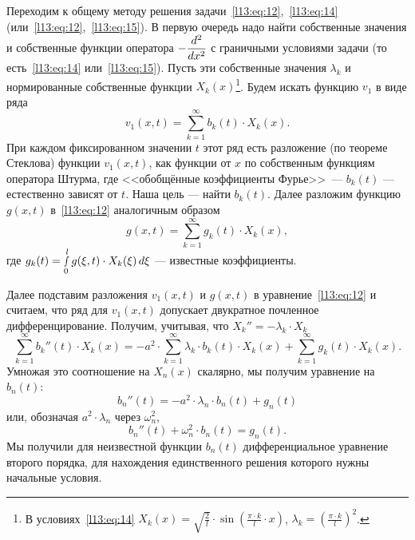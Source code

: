 Переходим к общему методу решения задачи~\eqref{l13:eq:12},~\eqref{l13:eq:14} (или~\eqref{l13:eq:12},~\eqref{l13:eq:15}). В первую очередь надо найти собственные значения и собственные функции оператора $\displaystyle-\frac{d^2}{dx^2}$ с граничными условиями задачи (то есть~\eqref{l13:eq:14} или~\eqref{l13:eq:15}). Пусть эти собственные значения $\lambda_k$ и нормированные собственные функции $X_k(x)$\footnote{В условиях~\eqref{l13:eq:14} $\displaystyle X_k(x)=\sqrt{\frac{2}{l}}\cdot\sin\left(\frac{\pi\cdot k}{l}\cdot x\right)$, $\displaystyle\lambda_k=\left(\frac{\pi\cdot k}{l}\right)^2$.}. Будем искать функцию $v_1$ в виде ряда
\begin{equation*}
	 v_1(x,t)=\sum\limits_{k=1}^{\infty}b_k(t)\cdot X_k(x).
\end{equation*}
При каждом фиксированном значении $t$ этот ряд есть разложение (по теореме Стеклова) функции $v_1(x,t)$, как функции от $x$ по собственным функциям оператора Штурма, где <<обобщённые коэффициенты Фурье>>~--- $b_k(t)$ --- естественно зависят от $t$. Наша цель --- найти $b_k(t)$. Далее разложим функцию $g(x,t)$ в~\eqref{l13:eq:12} аналогичным образом
\begin{equation*}
	 g(x,t)=\sum\limits_{k=1}^{\infty}g_k(t)\cdot X_k(x),
\end{equation*}
где $\displaystyle g_k(t)=\smallint\limits_0^l g(\xi,t)\cdot X_k(\xi)\,d\xi$ --- известные коэффициенты.

Далее подставим разложения $v_1(x,t)$ и $g(x,t)$ в уравнение~\eqref{l13:eq:12} и считаем, что ряд для $v_1(x,t)$ допускает двукратное почленное дифференцирование. Получим, учитывая, что $X_k''=-\lambda_k\cdot X_k$
\begin{equation*}
	\sum\limits_{k=1}^{\infty}b_k''(t)\cdot X_k(x)=-a^2\cdot\sum\limits_{k=1}^{\infty} \lambda_k\cdot b_k(t)\cdot X_k(x)+\sum\limits_{k=1}^{\infty}g_k(t)\cdot X_k(x).
\end{equation*}
Умножая это соотношение на $X_n(x)$ скалярно, мы получим уравнение на $b_n(t)$:
\begin{equation*}
	 b_n''(t)=-a^2\cdot\lambda_n\cdot b_n(t)+g_n(t)
\end{equation*}
или, обозначая $a^2\cdot\lambda_n$ через $\omega_n^2$,
\begin{equation}\label{l13:eq:19}
	 b_n''(t)+\omega_n^2\cdot b_n(t)=g_n(t).
\end{equation}
Мы получили для неизвестной функции $b_n(t)$ дифференциальное уравнение второго порядка, для нахождения единственного решения которого нужны начальные условия. 

